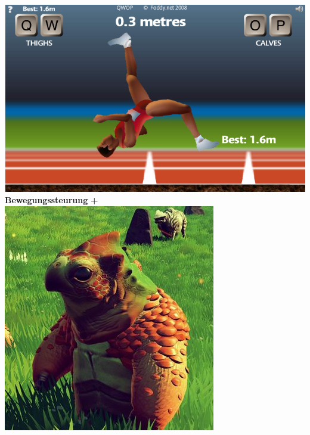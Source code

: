 \documentclass{beamer}
\begin{document}
\begin{frame}
	\begin{columns}[c]
		\centering		
		\includegraphics[width=\textwidth]{img/games/qwop.png} \\
		\vspace{1.5em}
		\textbf{Bewegungssteurung}
		\pause
		\centering
		\textbf{\huge +}
		\centering
		\includegraphics[width=\textwidth]{img/games/nms3.png} \\

\end{columns}
\end{frame}
\end{document}
